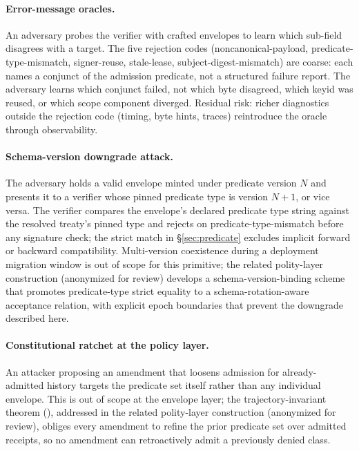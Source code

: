 \paragraph{Error-message oracles.} An adversary probes the verifier with crafted envelopes to learn which sub-field disagrees with a target. The five rejection codes (noncanonical-payload, predicate-type-mismatch, signer-reuse, stale-lease, subject-digest-mismatch) are coarse: each names a conjunct of the admission predicate, not a structured failure report. The adversary learns which conjunct failed, not which byte disagreed, which keyid was reused, or which scope component diverged. Residual risk: richer diagnostics outside the rejection code (timing, byte hints, traces) reintroduce the oracle through observability.

\paragraph{Schema-version downgrade attack.} The adversary holds a valid envelope minted under predicate version $N$ and presents it to a verifier whose pinned predicate type is version $N{+}1$, or vice versa. The verifier compares the envelope's declared predicate type string against the resolved treaty's pinned type and rejects on predicate-type-mismatch before any signature check; the strict match in \S\ref{sec:predicate} excludes implicit forward or backward compatibility. Multi-version coexistence during a deployment migration window is out of scope for this primitive; the related polity-layer construction (anonymized for review) develops a schema-version-binding scheme that promotes predicate-type strict equality to a schema-rotation-aware acceptance relation, with explicit epoch boundaries that prevent the downgrade described here.

\paragraph{Constitutional ratchet at the policy layer.} An attacker proposing an amendment that loosens admission for already-admitted history targets the predicate set itself rather than any individual envelope. This is out of scope at the envelope layer; the trajectory-invariant theorem (), addressed in the related polity-layer construction (anonymized for review), obliges every amendment to refine the prior predicate set over admitted receipts, so no amendment can retroactively admit a previously denied class.
